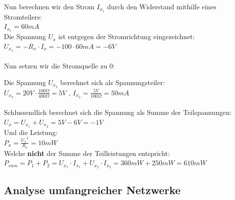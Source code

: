 											Nun berechnen wir den Strom $I_{x_1}$ durch den Widerstand mithilfe eines Stromteilers: \\
											$I_{x_1} = 60mA$ \\
											Die Spannung $U_x$ ist entgegen der Stromrichtung eingezeichnet: \\
											$U_{x_1} = - R_x \cdot I_x = - 100 \cdot 60mA = -6V $ \\
											\\
											Nun setzen wir die Stromquelle zu 0: \\
											\begin{center}
												\fix
											\end{center}

											Die Spannung $U_{x_2}$ berechnet sich als Spannungsteiler: \\
											$U_{x_2} = 20V \cdot \frac{100\Omega}{400\Omega} = 5V$ , $ I_{x_2} = \frac{5V}{100\Omega} = 50mA $\\
											\\
											Schlussendlich berechnet sich die Spannung als Summe der Teilspannungen:
											$U_x = U_{x_1} + U_{x_2} = 5V -6V = -1V $ \\
											Und die Leistung: \\
											$P_x = \frac{{U_x}^2}{R_x} = 10mW$ \\
											Welche \textbf{nicht} der Summe der Teilleistungen entspricht: \\
											$P_{sum} = P_1 + P_2 = U_{x_1} \cdot I_{x_1} + U_{x_2} \cdot I_{x_2} = 360mW + 250mW = 610mW$


										 \iend

										 \newpage





					          \subsection{Analyse umfangreicher Netzwerke}

